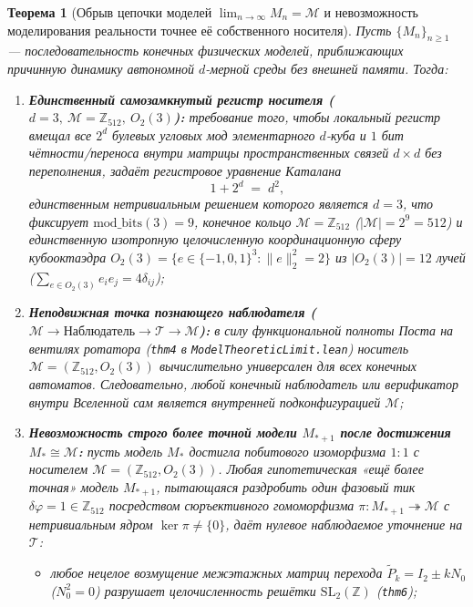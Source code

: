 \documentclass[11pt,a4paper]{article}
\newtheorem{theorem}{Теорема}[section]
\theoremstyle{definition}
\theoremstyle{remark}
\begin{document}
\begin{theorem}[Обрыв цепочки моделей $\lim_{n\to\infty} M_n = \mathcal{M}$ и невозможность моделирования реальности точнее её собственного носителя]
\label{thm:model-chain-termination}
Пусть $\{M_n\}_{n\ge 1}$ --- последовательность конечных физических моделей, приближающих причинную динамику автономной $d$-мерной среды без внешней памяти. Тогда:
\begin{enumerate}[label=\textbf{(\roman*)},leftmargin=*]
\item \textbf{Единственный самозамкнутый регистр носителя ($d=3,\ \mathcal{M}=\mathbb{Z}_{512},\ O_2(3)$):}
  требование того, чтобы локальный регистр вмещал все $2^d$ булевых угловых мод элементарного $d$-куба и $1$ бит чётности/переноса внутри матрицы пространственных связей $d\times d$ без переполнения, задаёт регистровое уравнение Каталана
  \begin{equation}
    \label{eq:catalan-closure}
    1 + 2^d \;=\; d^2,
  \end{equation}
  единственным нетривиальным решением которого является $d = 3$, что фиксирует $\mathrm{mod\_bits}(3) = 9$, конечное кольцо $\mathcal{M} = \mathbb{Z}_{512}$ ($|\mathcal{M}| = 2^9 = 512$) и единственную изотропную целочисленную координационную сферу кубооктаэдра $O_2(3) = \{e\in\{-1,0,1\}^3 : \|e\|_2^2 = 2\}$ из $|O_2(3)| = 12$ лучей ($\sum_{e\in O_2(3)} e_i e_j = 4\delta_{ij}$);
\item \textbf{Неподвижная точка познающего наблюдателя ($\mathcal{M} \to \text{Наблюдатель} \to \mathcal{T} \to \mathcal{M}$):}
  в силу функциональной полноты Поста на вентилях ротатора (\texttt{thm4} в \texttt{ModelTheoreticLimit.lean}) носитель $\mathcal{M} = (\mathbb{Z}_{512}, O_2(3))$ вычислительно универсален для всех конечных автоматов. Следовательно, любой конечный наблюдатель или верификатор внутри Вселенной сам является внутренней подконфигурацией $\mathcal{M}$;
\item \textbf{Невозможность строго более точной модели $M_{*+1}$ после достижения $M_* \cong \mathcal{M}$:}
  пусть модель $M_*$ достигла побитового изоморфизма $1:1$ с носителем $\mathcal{M} = (\mathbb{Z}_{512}, O_2(3))$. Любая гипотетическая «ещё более точная» модель $M_{*+1}$, пытающаяся раздробить один фазовый тик $\delta\varphi = 1\in\mathbb{Z}_{512}$ посредством сюръективного гомоморфизма $\pi : M_{*+1} \twoheadrightarrow \mathcal{M}$ с нетривиальным ядром $\ker\pi \ne \{0\}$, даёт нулевое наблюдаемое уточнение на $\mathcal{T}$:
  \begin{itemize}[noitemsep]
  \item любое нецелое возмущение межэтажных матриц перехода $\widetilde{P}_k = I_2 \pm k N_0$ ($N_0^2 = 0$) разрушает целочисленность решётки $\mathrm{SL}_2(\mathbb{Z})$ (\texttt{thm6});

\end{itemize}
\end{enumerate}
\end{theorem}
\end{document}
